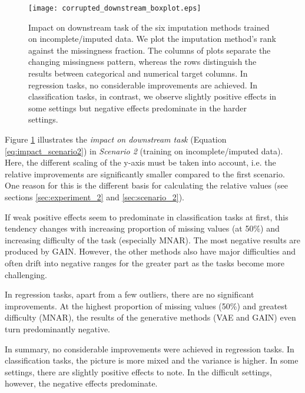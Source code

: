 \begin{figure}\centering
	\texttt{[image: corrupted\_downstream\_boxplot.eps]}

	\caption[Downstream Ranks - Corrupted]{Impact on downstream task of the six imputation methods trained on incomplete/imputed data. We plot the imputation method's rank against the missingness fraction. The columns of plots separate the changing missingness pattern, whereas the rows distinguish the results between categorical and numerical target columns. In regression tasks, no considerable improvements are achieved. In classification tasks, in contrast, we observe slightly positive effects in some settings but negative effects predominate in the harder settings.
    }
	\label{fig:corrupted_downstream_boxplot}
\end{figure}

Figure \ref{fig:corrupted_downstream_boxplot} illustrates the \textit{impact on downstream task} (Equation \ref{eq:impact_scenario2}) in \textit{Scenario 2} (training on incomplete/imputed data). Here, the different scaling of the y-axis must be taken into account, i.e. the relative improvements are significantly smaller compared to the first scenario. One reason for this is the different basis for calculating the relative values (see sections \autoref{sec:experiment_2} and \autoref{sec:scenario_2}).  

If weak positive effects seem to predominate in classification tasks at first, this tendency changes with increasing proportion of missing values (at 50\%) and increasing difficulty of the task (especially MNAR). The most negative results are produced by GAIN. However, the other methods also have major difficulties and often drift into negative ranges for the greater part as the tasks become more challenging.

In regression tasks, apart from a few outliers, there are no significant improvements. At the highest proportion of missing values (50\%) and greatest difficulty (MNAR), the results of the generative methods (VAE and GAIN) even turn predominantly negative.

In summary, no considerable improvements were achieved in regression tasks. In classification tasks, the picture is more mixed and the variance is higher. In some settings, there are slightly positive effects to note. In the difficult settings, however, the negative effects predominate.

